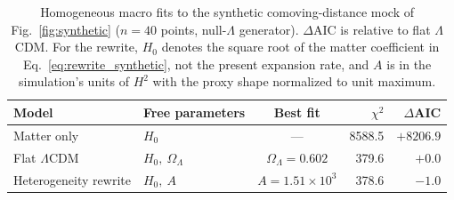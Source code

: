 \begin{table}[t]
\centering
\small
\caption{Homogeneous macro fits to the synthetic comoving-distance mock of Fig.~\ref{fig:synthetic} ($n=40$ points, null-$\Lambda$ generator). $\Delta$AIC is relative to flat $\Lambda$CDM. For the rewrite, $H_0$ denotes the square root of the matter coefficient in Eq.~\eqref{eq:rewrite_synthetic}, not the present expansion rate, and $A$ is in the simulation's units of $H^2$ with the proxy shape normalized to unit maximum.}
\label{tab:synth_inference}
\begin{tabular}{@{}llcrr@{}}
\toprule
Model & Free parameters & Best fit & $\chi^2$ & $\Delta$AIC \\
\midrule
Matter only & $H_0$ & --- & 8588.5 & $+8206.9$ \\
Flat $\Lambda$CDM & $H_0,\ \Omega_\Lambda$ & $\Omega_\Lambda=0.602$ & 379.6 & $+0.0$ \\
Heterogeneity rewrite & $H_0,\ A$ & $A=1.51\times10^{3}$ & 378.6 & $-1.0$ \\
\bottomrule
\end{tabular}
\end{table}
